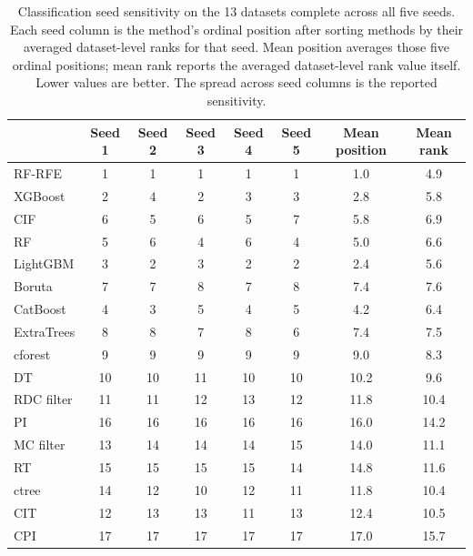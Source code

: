 \begin{table}[!htbp]
  \centering
  \footnotesize
  \setlength{\tabcolsep}{4pt}
  \renewcommand{\arraystretch}{1.04}
  \begin{tabular}{@{}l
    S[table-format=2.0]
    S[table-format=2.0]
    S[table-format=2.0]
    S[table-format=2.0]
    S[table-format=2.0]
    S[table-format=2.1]
    S[table-format=2.1]@{}}
    \toprule
     & {Seed 1} & {Seed 2} & {Seed 3} & {Seed 4} & {Seed 5} & {Mean position} & {Mean rank} \\
    \midrule
    RF-RFE & 1 & 1 & 1 & 1 & 1 & 1.0 & 4.9 \\
    XGBoost & 2 & 4 & 2 & 3 & 3 & 2.8 & 5.8 \\
    CIF & 6 & 5 & 6 & 5 & 7 & 5.8 & 6.9 \\
    RF & 5 & 6 & 4 & 6 & 4 & 5.0 & 6.6 \\
    LightGBM & 3 & 2 & 3 & 2 & 2 & 2.4 & 5.6 \\
    Boruta & 7 & 7 & 8 & 7 & 8 & 7.4 & 7.6 \\
    CatBoost & 4 & 3 & 5 & 4 & 5 & 4.2 & 6.4 \\
    ExtraTrees & 8 & 8 & 7 & 8 & 6 & 7.4 & 7.5 \\
    cforest & 9 & 9 & 9 & 9 & 9 & 9.0 & 8.3 \\
    DT & 10 & 10 & 11 & 10 & 10 & 10.2 & 9.6 \\
    RDC filter & 11 & 11 & 12 & 13 & 12 & 11.8 & 10.4 \\
    PI & 16 & 16 & 16 & 16 & 16 & 16.0 & 14.2 \\
    MC filter & 13 & 14 & 14 & 14 & 15 & 14.0 & 11.1 \\
    RT & 15 & 15 & 15 & 15 & 14 & 14.8 & 11.6 \\
    ctree & 14 & 12 & 10 & 12 & 11 & 11.8 & 10.4 \\
    CIT & 12 & 13 & 13 & 11 & 13 & 12.4 & 10.5 \\
    CPI & 17 & 17 & 17 & 17 & 17 & 17.0 & 15.7 \\
    \bottomrule
  \end{tabular}
  \caption{Classification seed sensitivity on the 13 datasets complete across
  all five seeds. Each seed column is the method's ordinal position after
  sorting methods by their averaged dataset-level ranks for that seed. Mean
  position averages those five ordinal positions; mean rank reports the averaged
  dataset-level rank value itself. Lower values are better. The spread across seed columns is the reported sensitivity.}
  \label{tab:classification-seed-sensitivity}
\end{table}

